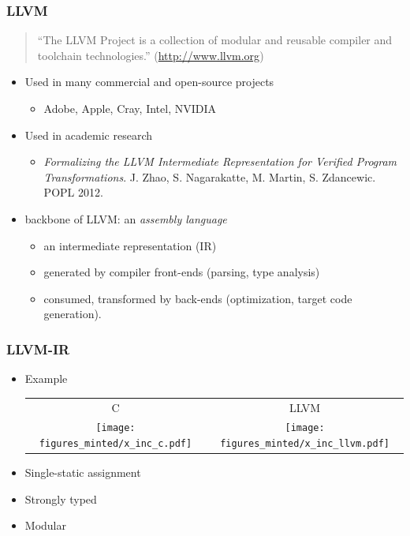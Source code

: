 \documentclass[12pt]{beamer}
\begin{document}
\begin{frame}
\frametitle{LLVM}

\begin{quote}
``The LLVM Project is a collection of modular and reusable compiler and toolchain technologies.'' (\url{http://www.llvm.org})
\end{quote}

\begin{itemize}
\item Used in many commercial and open-source projects
\begin{itemize}
\item Adobe, Apple, Cray, Intel, NVIDIA 
\end{itemize}
\item Used in academic research
\begin{itemize}
\item \emph{Formalizing the LLVM Intermediate Representation for Verified Program Transformations}. J. Zhao, S. Nagarakatte, M. Martin, S. Zdancewic. POPL 2012.
\end{itemize}
\item backbone of LLVM: an \emph{assembly language}
\begin{itemize}
\item an intermediate representation (IR)
\item generated by compiler front-ends (parsing, type analysis) 
\item consumed, transformed by back-ends (optimization, target code
  generation).
\end{itemize}
\end{itemize}
	
\end{frame}

\begin{frame}
\frametitle{LLVM-IR}

\begin{itemize}
\item Example
\begin{center}
\begin{tabular}[t]{cc}
  C & LLVM \\
  \texttt{[image: figures\_minted/x\_inc\_c.pdf]}&
  \texttt{[image: figures\_minted/x\_inc\_llvm.pdf]}
\end{tabular}
\end{center}
\item Single-static assignment
\item Strongly typed
\item Modular
\end{itemize}

\end{frame}
\end{document}
